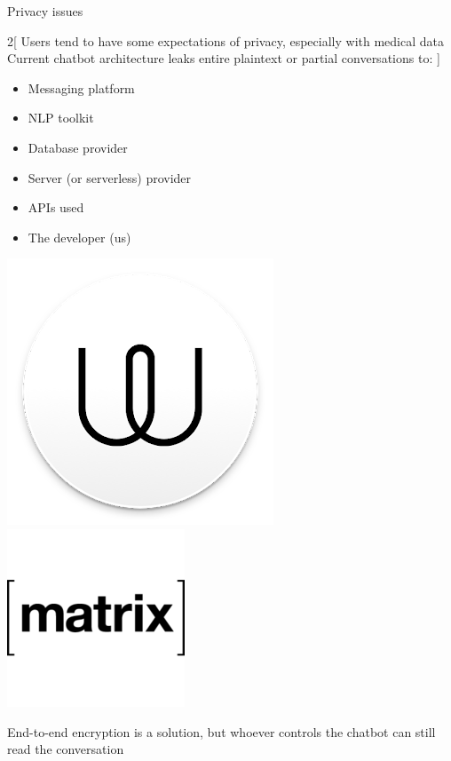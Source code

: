 \documentclass[landscape]{infslides}
\begin{document}
\begin{slide}{Privacy issues}
    \begin{multicols}{2}[
    Users tend to have some expectations of privacy, especially with medical data
    Current chatbot architecture leaks entire plaintext or partial conversations to:
    ]
    \begin{itemize}\shrinklist
        \item Messaging platform
        \item NLP toolkit
        \item Database provider
        \item Server (or serverless) provider
        \item APIs used
        \item The developer (us) 
    \end{itemize}


    \includegraphics[scale=0.5]{wire_logo.png}
    \includegraphics[scale=0.5]{matrix_logo.png}

    \end{multicols}
    End-to-end encryption is a solution, but whoever controls the chatbot can still read the conversation
\end{slide}
\end{document}
